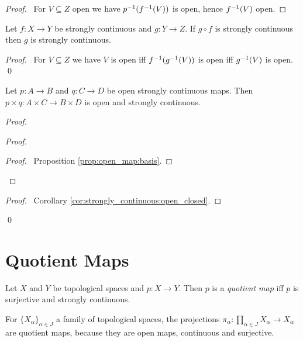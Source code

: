 \begin{proof}
  \pf\ For $V \subseteq Z$ open we have ${p}^{-1}({f}^{-1}(V))$ is open, hence ${f}^{-1}(V)$ open.
\end{proof}

\begin{prop}
  Let $f : X \rightarrow Y$ be strongly continuous and $g : Y \rightarrow Z$.
  If $g \circ f$ is strongly continuous then $g$ is strongly continuous.
\end{prop}

\begin{proof}
  \pf\ For $V \subseteq Z$ we have $V$ is open iff ${f}^{-1}({g}^{-1}(V))$ is open iff ${g}^{-1}(V)$ is open. \qed
\end{proof}

\begin{prop}
  \label{prop:strongly_continuous:product}
  Let $p : A \rightarrow B$ and $q : C \rightarrow D$ be open strongly continuous maps. Then $p \times q : A \times C \rightarrow B \times D$ is open and strongly continuous.
\end{prop}

\begin{proof}
  \pf
  \begin{proof}
    \qedstep
    \begin{proof}
      \pf\ Proposition \ref{prop:open_map:basis}.
    \end{proof}
  \end{proof}
  \begin{proof}
    \pf\ Corollary \ref{cor:strongly_continuous:open_closed}.
  \end{proof}
  \qed
\end{proof}

\section{Quotient Maps}

\begin{df}
  Let $X$ and $Y$ be topological spaces and $p : X \rightarrow Y$. Then $p$ is a \emph{quotient map} iff $p$ is surjective and strongly continuous.
\end{df}

\begin{ex}
  For $\{ X_\alpha \}_{\alpha \in J}$ a family of topological spaces, the projections $\pi_\alpha : \prod_{\alpha \in J} X_\alpha \rightarrow X_\alpha$ are quotient maps, because they are open maps, continuous and surjective.
\end{ex}

